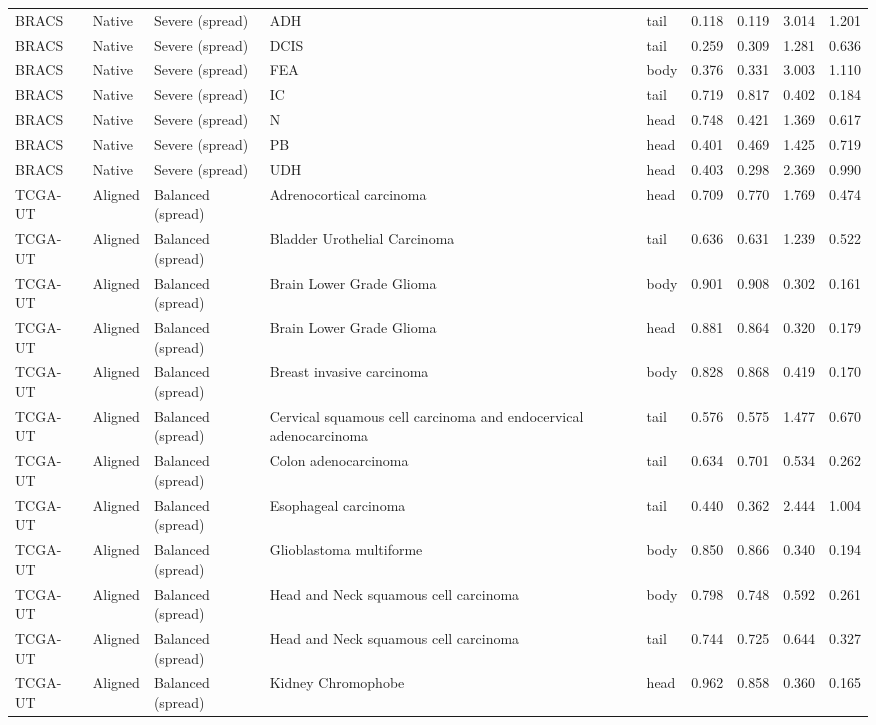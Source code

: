 \begin{longtable}{lllllrrrr}
BRACS & Native & Severe (spread) & ADH & tail & 0.118 & 0.119 & 3.014 & 1.201 \\
BRACS & Native & Severe (spread) & DCIS & tail & 0.259 & 0.309 & 1.281 & 0.636 \\
BRACS & Native & Severe (spread) & FEA & body & 0.376 & 0.331 & 3.003 & 1.110 \\
BRACS & Native & Severe (spread) & IC & tail & 0.719 & 0.817 & 0.402 & 0.184 \\
BRACS & Native & Severe (spread) & N & head & 0.748 & 0.421 & 1.369 & 0.617 \\
BRACS & Native & Severe (spread) & PB & head & 0.401 & 0.469 & 1.425 & 0.719 \\
BRACS & Native & Severe (spread) & UDH & head & 0.403 & 0.298 & 2.369 & 0.990 \\
TCGA-UT & Aligned & Balanced (spread) & Adrenocortical carcinoma & head & 0.709 & 0.770 & 1.769 & 0.474 \\
TCGA-UT & Aligned & Balanced (spread) & Bladder Urothelial Carcinoma & tail & 0.636 & 0.631 & 1.239 & 0.522 \\
TCGA-UT & Aligned & Balanced (spread) & Brain Lower Grade Glioma & body & 0.901 & 0.908 & 0.302 & 0.161 \\
TCGA-UT & Aligned & Balanced (spread) & Brain Lower Grade Glioma & head & 0.881 & 0.864 & 0.320 & 0.179 \\
TCGA-UT & Aligned & Balanced (spread) & Breast invasive carcinoma & body & 0.828 & 0.868 & 0.419 & 0.170 \\
TCGA-UT & Aligned & Balanced (spread) & Cervical squamous cell carcinoma and endocervical adenocarcinoma & tail & 0.576 & 0.575 & 1.477 & 0.670 \\
TCGA-UT & Aligned & Balanced (spread) & Colon adenocarcinoma & tail & 0.634 & 0.701 & 0.534 & 0.262 \\
TCGA-UT & Aligned & Balanced (spread) & Esophageal carcinoma & tail & 0.440 & 0.362 & 2.444 & 1.004 \\
TCGA-UT & Aligned & Balanced (spread) & Glioblastoma multiforme & body & 0.850 & 0.866 & 0.340 & 0.194 \\
TCGA-UT & Aligned & Balanced (spread) & Head and Neck squamous cell carcinoma & body & 0.798 & 0.748 & 0.592 & 0.261 \\
TCGA-UT & Aligned & Balanced (spread) & Head and Neck squamous cell carcinoma & tail & 0.744 & 0.725 & 0.644 & 0.327 \\
TCGA-UT & Aligned & Balanced (spread) & Kidney Chromophobe & head & 0.962 & 0.858 & 0.360 & 0.165 \\

\end{longtable}
